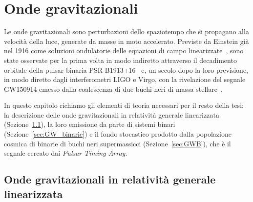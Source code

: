
\chapter{Onde gravitazionali} \label{chpt:GW}
\sloppy

Le onde gravitazionali sono perturbazioni dello spaziotempo che si propagano alla velocità della luce, generate da masse in moto accelerato. Previste da Einstein già nel 1916 come soluzioni ondulatorie delle equazioni di campo linearizzate~\cite{Einstein1916, Einstein1918}, sono state osservate per la prima volta in modo indiretto attraverso il decadimento orbitale della pulsar binaria PSR B1913+16~\cite{HulseTaylor1975, TaylorWeisberg1982} e, un secolo dopo la loro previsione, in modo diretto dagli interferometri LIGO e Virgo, con la rivelazione del segnale GW150914 emesso dalla coalescenza di due buchi neri di massa stellare~\cite{LIGO2016}.

In questo capitolo richiamo gli elementi di teoria necessari per il resto della tesi: la descrizione delle onde gravitazionali in relatività generale linearizzata (Sezione~\ref{sec:GW_linearizzata}), la loro emissione da parte di sistemi binari (Sezione~\ref{sec:GW_binarie}) e il fondo stocastico prodotto dalla popolazione cosmica di binarie di buchi neri supermassicci (Sezione~\ref{sec:GWB}), che è il segnale cercato dai \textit{Pulsar Timing Array}.

\section{Onde gravitazionali in relatività generale linearizzata} \label{sec:GW_linearizzata}

